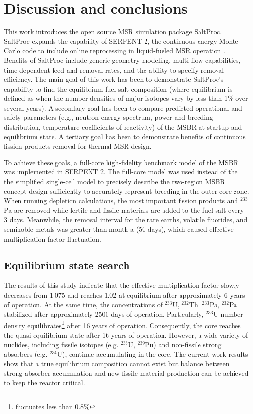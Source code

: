 \section{Discussion and conclusions}

This work introduces the open source \gls{MSR} simulation package SaltProc. 
SaltProc expands the capability of SERPENT 2, the continuous-energy Monte Carlo 
code to include online reprocessing in liquid-fueled \gls{MSR} operation 
\cite{andrei_rykhlevskii_arfc/saltproc:_2018}. Benefits of SaltProc include 
generic geometry modeling, multi-flow capabilities, time-dependent feed and 
removal rates, and the ability to specify removal efficiency. The main goal of 
this work has 
been to demonstrate SaltProc's capability to find the equilibrium fuel salt 
composition (where equilibrium is defined as when the number densities of major 
isotopes vary by less than 1\% over several years). A secondary goal has been to 
compare predicted operational and safety parameters (e.g., neutron energy 
spectrum, power and breeding distribution, temperature coefficients of 
reactivity) of the \gls{MSBR} at startup and equilibrium state. A tertiary goal 
has been to demonstrate benefits of continuous fission products removal for 
thermal \gls{MSR} design.

To achieve these goals, a full-core high-fidelity benchmark model of the \gls{MSBR} 
was implemented in SERPENT 2. The full-core model was used instead of the 
the simplified single-cell model \cite{betzler_molten_2017, 
rykhlevskii_online_2017, betzler_fuel_2018} to precisely describe the 
two-region \gls{MSBR} concept design sufficiently to accurately represent 
breeding in the outer core zone. When running depletion calculations, the most 
important fission products and $^{233}$Pa are removed while fertile and fissile 
materials are added to the fuel salt every 3 days.  Meanwhile, the removal 
interval for the rare earths, volatile fluorides, and seminoble metals was greater 
than month a (50 days), which caused effective multiplication factor fluctuation. 

\subsection{Equilibrium state search}
The results of this study indicate that the effective multiplication factor 
slowly decreases from 1.075 and reaches 1.02 at equilibrium after approximately 
6 years of operation. At the same time, the concentrations of $^{233}$U, $^{232}$Th, 
$^{233}$Pa, $^{232}$Pa stabilized after approximately 2500 days of operation. 
Particularly, $^{233}$U number density equilibrates\footnote{fluctuates less 
than 0.8\%} after 16 years of operation. Consequently, the core reaches the quasi-equilibrium state 
after 16 years of operation. However, a wide variety of nuclides, 
including fissile isotopes (e.g. $^{233}$U, $^{239}$Pu) and non-fissile strong 
absorbers (e.g. $^{234}$U), continue accumulating in the core. The current work results 
show that a true equilibrium composition cannot exist but balance
between strong absorber accumulation and new fissile material 
production can be achieved to keep the reactor critical.

